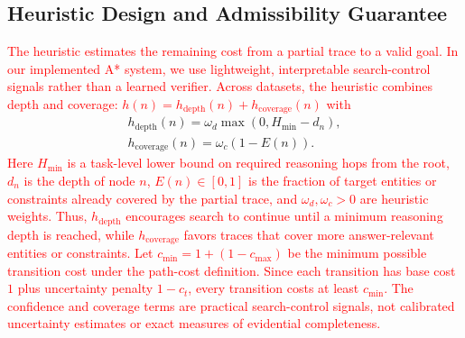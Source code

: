 \documentclass[11pt]{article}
\begin{document}






\subsection{Heuristic Design and Admissibility Guarantee}
\label{sec:heuristic_design}

\textcolor{red}{The heuristic estimates the remaining cost from a partial trace to a valid goal. In our implemented A* system, we use lightweight, interpretable search-control signals rather than a learned verifier. Across datasets, the heuristic combines depth and coverage: $h(n)=h_{\mathrm{depth}}(n)+h_{\mathrm{coverage}}(n)$ with}
\begin{multline}
h_{\mathrm{depth}}(n)=\omega_d\max(0,H_{\min}-d_n),
\\
h_{\mathrm{coverage}}(n)=\omega_c(1-E(n)).
\end{multline}
\textcolor{red}{Here \(H_{\min}\) is a task-level lower bound on required reasoning hops from the root, \(d_n\) is the depth of node \(n\), \(E(n)\in[0,1]\) is the fraction of target entities or constraints already covered by the partial trace, and \(\omega_d,\omega_c>0\) are heuristic weights. Thus, \(h_{\mathrm{depth}}\) encourages search to continue until a minimum reasoning depth is reached, while \(h_{\mathrm{coverage}}\) favors traces that cover more answer-relevant entities or constraints. Let $c_{\min}=1+(1-c_{\max})$ be the minimum possible transition cost under the path-cost definition. Since each transition has base cost \(1\) plus uncertainty penalty \(1-c_t\), every transition costs at least \(c_{\min}\). The confidence and coverage terms are practical search-control signals, not calibrated uncertainty estimates or exact measures of evidential completeness.}
\end{document}

